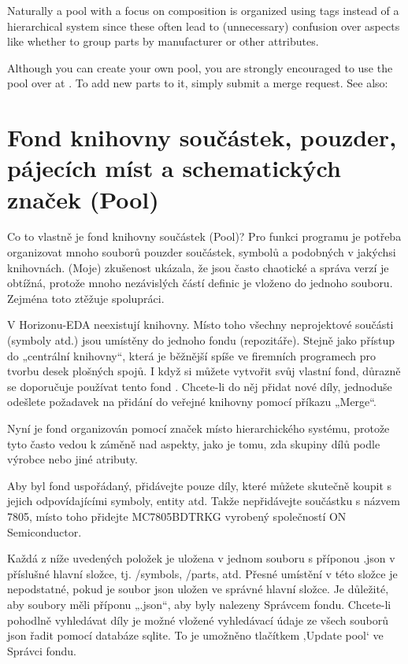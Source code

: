 \documentclass[letterpaper,10pt,czech]{sphinxmanual}
\begin{document}
Naturally a pool with a focus on composition is organized using tags instead of a hierarchical system since these often lead to (unnecessary) confusion over aspects like whether to group parts by manufacturer or other attributes.

Although you can create your own pool, you are strongly encouraged to use the pool
over at
.
To add new parts to it, simply submit a merge request. See also: {\hyperref[\detokenize{pool-contribute::doc}]{}}


\chapter{Fond knihovny součástek, pouzder, pájecích míst a schematických značek (Pool)}
\label{\detokenize{pool-elements:fond-knihovny-soucastek-pouzder-pajecich-mist-a-schematickych-znacek-pool}}\label{\detokenize{pool-elements::doc}}
Co to vlastně je fond knihovny součástek (Pool)? Pro funkci programu je potřeba organizovat mnoho souborů pouzder součástek, symbolů a podobných v jakýchsi knihovnách. (Moje) zkušenost ukázala, že jsou často chaotické a správa verzí je obtížná, protože mnoho nezávislých částí definic je vloženo do jednoho souboru. Zejména toto ztěžuje spolupráci.

V Horizonu-EDA neexistují knihovny. Místo toho všechny neprojektové součásti (symboly atd.) jsou umístěny do jednoho fondu (repozitáře). Stejně jako přístup do „centrální knihovny“, která je běžnější spíše ve firemních programech pro tvorbu desek plošných spojů. I když si můžete vytvořit svůj vlastní fond, důrazně se doporučuje používat tento fond
. Chcete-li do něj přidat nové díly, jednoduše odešlete požadavek na přidání do veřejné knihovny pomocí příkazu „Merge“.

Nyní je fond organizován pomocí značek místo hierarchického
systému, protože tyto často vedou k záměně nad aspekty, jako je tomu, zda
skupiny dílů podle výrobce nebo jiné atributy.

Aby byl fond uspořádaný, přidávejte pouze díly, které můžete skutečně koupit s jejich odpovídajícími symboly, entity atd. Takže nepřidávejte součástku s názvem 7805, místo toho přidejte MC7805BDTRKG vyrobený společností ON Semiconductor.

Každá z níže uvedených položek je uložena v jednom souboru s příponou .json v příslušné hlavní složce, tj. /symbols, /parts, atd. Přesné umístění v této složce je nepodstatné, pokud je soubor json uložen ve
správné hlavní složce. Je důležité, aby soubory měli příponu „.json“, aby byly nalezeny Správcem fondu. Chcete-li pohodlně vyhledávat díly je možné vložené vyhledávací údaje ze všech souborů json řadit pomocí databáze sqlite. To je umožněno tlačítkem ‚Update pool‘ ve Správci fondu.
\end{document}

